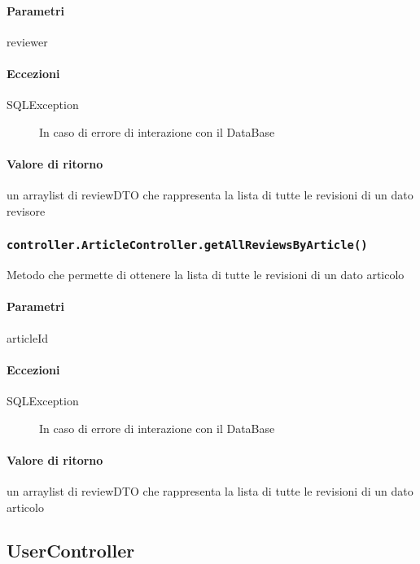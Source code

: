 \paragraph{Parametri}
\begin{description}
\item reviewer
\end{description}
\paragraph{Eccezioni}
\begin{description}
\item[SQLException] In caso di errore di interazione con il DataBase
\end{description}
\paragraph{Valore di ritorno}
un arraylist di reviewDTO che rappresenta la lista di tutte le revisioni di un dato revisore


\subsubsection{\texttt{controller.ArticleController.getAllReviewsByArticle()}}
Metodo che permette di ottenere la lista di tutte le revisioni di un dato articolo
\paragraph{Parametri}
\begin{description}
\item articleId
\end{description}
\paragraph{Eccezioni}
\begin{description}
\item[SQLException] In caso di errore di interazione con il DataBase
\end{description}
\paragraph{Valore di ritorno}
un arraylist di reviewDTO che rappresenta la lista di tutte le revisioni di un dato articolo


\subsection{UserController}
